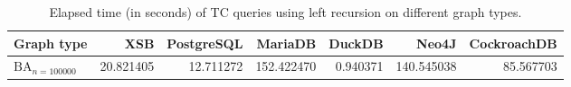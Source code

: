 \begin{table}
\caption{Elapsed time (in seconds) of TC queries using left recursion on different graph types.}
\label{table:left_recursion_real_time}
\begin{tabular}{lrrrrrr}
\toprule
Graph type & XSB & PostgreSQL & MariaDB & DuckDB & Neo4J & CockroachDB \\
\midrule
$\text{BA}_{n=100000}$ & 20.821405 & 12.711272 & 152.422470 & 0.940371 & 140.545038 & 85.567703 \\
\bottomrule
\end{tabular}
\end{table}
